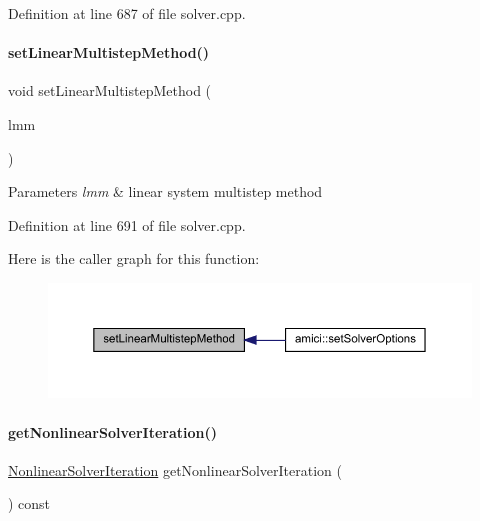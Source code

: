 Definition at line 687 of file solver.\+cpp.

\mbox{\label{classamici_1_1_solver_a2143a6f85b81c24611aad5689865953c}} 
\paragraph{\texorpdfstring{set\+Linear\+Multistep\+Method()}{setLinearMultistepMethod()}}
{\footnotesize\ttfamily void set\+Linear\+Multistep\+Method (\begin{DoxyParamCaption}\item[{\mbox{\hyperlink{namespaceamici_a9ebe272482a8e073efe7078b7e96e8bc}{Linear\+Multistep\+Method}}}]{lmm }\end{DoxyParamCaption})}


\begin{DoxyParams}{Parameters}
{\em lmm} & linear system multistep method \\
\hline
\end{DoxyParams}


Definition at line 691 of file solver.\+cpp.

Here is the caller graph for this function\+:
\nopagebreak
\begin{figure}[H]
\begin{center}
\leavevmode
\includegraphics[width=350pt]{classamici_1_1_solver_a2143a6f85b81c24611aad5689865953c_icgraph}
\end{center}
\end{figure}
\mbox{\label{classamici_1_1_solver_a33883905a8ab056896373d76f18ce683}} 
\paragraph{\texorpdfstring{get\+Nonlinear\+Solver\+Iteration()}{getNonlinearSolverIteration()}}
{\footnotesize\ttfamily \mbox{\hyperlink{namespaceamici_a13388d34e4c35bb592c3e821c35cc923}{Nonlinear\+Solver\+Iteration}} get\+Nonlinear\+Solver\+Iteration (\begin{DoxyParamCaption}{ }\end{DoxyParamCaption}) const}

